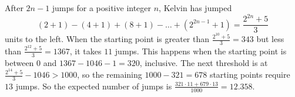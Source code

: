 After $2n-1$ jumps for a positive integer $n$, Kelvin has jumped \[\left(2+1\right)-\left(4+1\right)+\left(8+1\right)-\ldots+\left(2^{2n-1}+1\right)=\frac{2^{2n}+5}{3}\] units to the left. When the starting point is greater than $\frac{2^{10}+5}{3}=343$ but less than $\frac{2^{12}+5}{3}=1367$, it takes $11$ jumps. This happens when the starting point is between $0$ and $1367-1046-1=320$, inclusive. The next threshold is at $\frac{2^{14}+5}{3}-1046>1000$, so the remaining $1000-321=678$ starting points require $13$ jumps. So the expected number of jumps is $\frac{321\cdot11+679\cdot13}{1000}=\boxed{12.358}$.